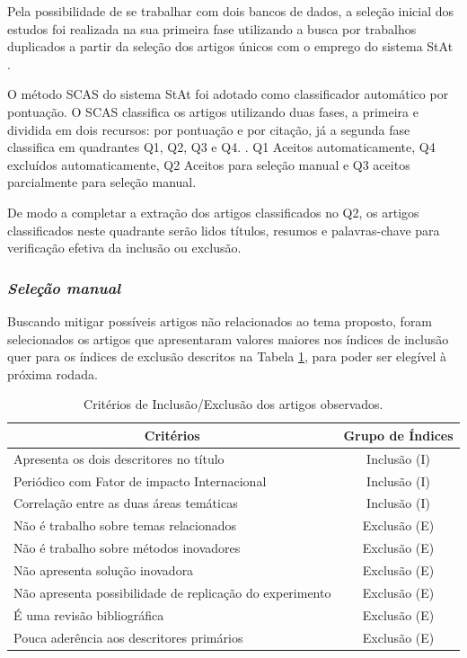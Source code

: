 Pela possibilidade de se trabalhar com dois bancos de dados, a seleção inicial dos estudos foi realizada na sua primeira fase utilizando a busca por trabalhos duplicados a partir da seleção dos artigos únicos com o emprego do sistema StAt \cite{LaPES2016}.

O método SCAS do sistema StAt \cite{LaPES2016} foi adotado como classificador automático por pontuação. O SCAS classifica os artigos utilizando duas fases, a primeira e dividida em dois recursos: por pontuação e por citação, já a segunda fase classifica em quadrantes Q1, Q2, Q3 e Q4. \cite{Octaviano2015}. Q1 Aceitos automaticamente, Q4 excluídos automaticamente, Q2 Aceitos para seleção manual e Q3 aceitos parcialmente para seleção manual. 

De modo a completar a extração dos artigos classificados no Q2, os artigos classificados neste quadrante serão lidos títulos, resumos e palavras-chave para verificação efetiva da inclusão ou exclusão.

\subsubsection*{\textit{Seleção manual}}

Buscando mitigar possíveis artigos não relacionados ao tema proposto, foram selecionados os artigos que apresentaram valores maiores nos índices de inclusão quer para os índices de exclusão descritos na Tabela \ref{tab:3}, para poder ser elegível à próxima rodada.


\begin{table}[H]
 \centering
 \caption{Critérios de Inclusão/Exclusão dos artigos observados.}
  \label{tab:3}
    \begin{tabular}{lc}
      \hline
      \multicolumn{1}{c}{\textbf{Critérios}}                     & \textbf{Grupo de Índices}  \\ \hline
      Apresenta os dois descritores no título                  & Inclusão (I)               \\
      Periódico com Fator de impacto Internacional             & Inclusão (I)               \\
      Correlação entre as duas áreas temáticas                 & Inclusão (I)               \\
      Não é trabalho sobre temas relacionados                  & Exclusão (E)               \\
      Não é trabalho sobre métodos inovadores                  & Exclusão (E)               \\
      Não apresenta solução inovadora                          & Exclusão (E)               \\
      Não apresenta possibilidade de replicação do experimento & Exclusão (E)               \\
      É uma revisão bibliográfica                              & Exclusão (E)               \\
      Pouca aderência aos descritores primários                & Exclusão (E)               \\ \hline
    \end{tabular}%
\end{table}

